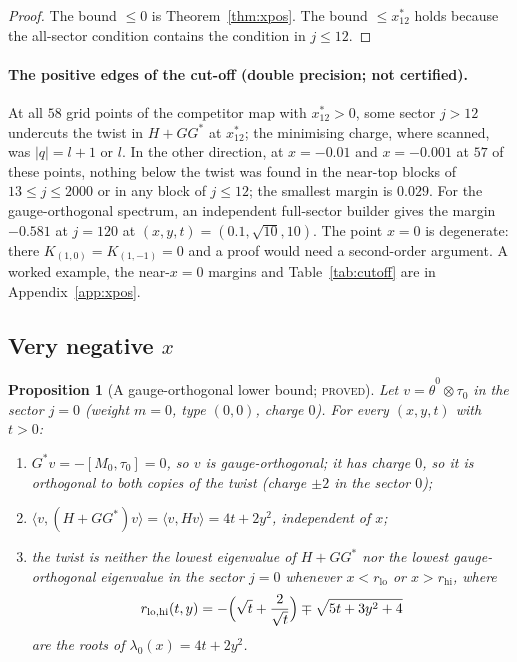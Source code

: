 \documentclass[11pt]{article}
\newtheorem{proposition}[theorem]{Proposition}
\theoremstyle{definition}
\theoremstyle{remark}
\newcommand{\PROVED}{\textsc{proved}}
\begin{document}
\begin{proof}
The bound $\le0$ is Theorem~\ref{thm:xpos}. The bound $\le x^*_{12}$ holds because the all-sector condition contains
the condition in $j\le12$.
\end{proof}

\paragraph{The positive edges of the cut-off (double precision; not certified).} At all $58$ grid points of the
competitor map with $x^*_{12}>0$, some sector $j>12$ undercuts the twist in $H+GG^*$ at $x^*_{12}$; the minimising
charge, where scanned, was $|q|=l+1$ or $l$. In the other direction, at $x=-0.01$ and $x=-0.001$ at $57$ of these
points, nothing below the twist was found in the near-top blocks of $13\le j\le2000$ or in any block of $j\le12$; the
smallest margin is $0.029$. For the gauge-orthogonal spectrum, an independent full-sector builder gives the margin
$-0.581$ at $j=120$ at $(x,y,t)=(0.1,\sqrt{10},10)$. The point $x=0$ is degenerate: there $K_{(1,0)}=K_{(1,-1)}=0$ and
a proof would need a second-order argument. A worked example, the near-$x=0$ margins and Table~\ref{tab:cutoff} are in
Appendix~\ref{app:xpos}.

\subsection{Very negative \texorpdfstring{$x$}{x}}

\begin{proposition}[A gauge-orthogonal lower bound; \PROVED]\label{prop:lower}
Let $v=\hat\theta^0\otimes\tau_0$ in the sector $j=0$ (weight $m=0$, type $(0,0)$, charge $0$). For every
$(x,y,t)$ with $t>0$:
\begin{enumerate}
  \item $G^*v=-[M_0,\tau_0]=0$, so $v$ is gauge-orthogonal; it has charge $0$, so it is orthogonal to both copies of the
  twist (charge $\pm2$ in the sector $0$);
  \item $\langle v,(H+GG^*)v\rangle=\langle v,Hv\rangle=4t+2y^2$, independent of $x$;
  \item the twist is neither the lowest eigenvalue of $H+GG^*$ nor the lowest gauge-orthogonal eigenvalue in the sector
  $j=0$ whenever $x<r_{\mathrm{lo}}$ or $x>r_{\mathrm{hi}}$, where
  \[
    r_{\mathrm{lo},\mathrm{hi}}(t,y)=-\Bigl(\sqrt t+\frac2{\sqrt t}\Bigr)\mp\sqrt{5t+3y^2+4}
  \]
  are the roots of $\lambda_0(x)=4t+2y^2$.
\end{enumerate}
\end{proposition}
\end{document}
